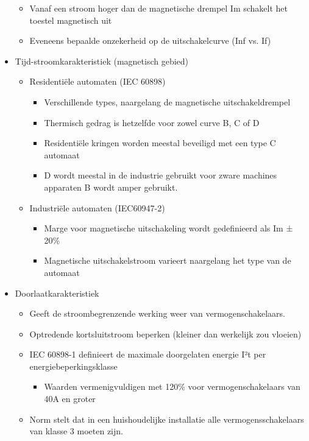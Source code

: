 \documentclass[12pt]{article}
\begin{document}
\begin{itemize}
\begin{itemize}
        \item Vanaf een stroom hoger dan de magnetische drempel Im schakelt het toestel magnetisch uit
        \item Eveneens bepaalde onzekerheid op de uitschakelcurve (Inf vs. If)
    \end{itemize}
    \item Tijd-stroomkarakteristiek (magnetisch gebied)\begin{itemize}
        \item Residentiële automaten (IEC 60898)\begin{itemize}
            \item Verschillende types, naargelang de magnetische uitschakeldrempel
            \item Thermisch gedrag is hetzelfde voor zowel curve B, C of D
            \item Residentiële kringen worden meestal beveiligd met een type C automaat
            \item D wordt meestal in de industrie gebruikt voor zware machines apparaten B wordt amper gebruikt.
        \end{itemize}
        \item Industriële automaten (IEC60947-2)\begin{itemize}
            \item Marge voor magnetische uitschakeling wordt gedefinieerd als Im ± 20\%
            \item Magnetische uitschakelstroom varieert naargelang het type van de automaat
        \end{itemize}
    \end{itemize}
    \item Doorlaatkarakteristiek\begin{itemize}
        \item Geeft de stroombegrenzende werking weer van vermogenschakelaars.
        \item Optredende kortsluitstroom beperken (kleiner dan werkelijk zou vloeien)
        \item IEC 60898-1 definieert de maximale doorgelaten energie I²t per energiebeperkingsklasse\begin{itemize}
            \item Waarden vermenigvuldigen met 120\% voor vermogenschakelaars van 40A en groter
        \end{itemize}
        \item Norm stelt dat in een huishoudelijke installatie alle vermogensschakelaars van klasse 3 moeten zijn.

\end{itemize}
\end{itemize}
\end{document}
